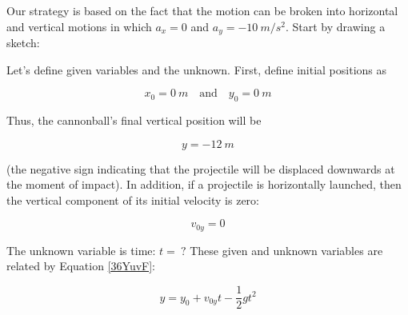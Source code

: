 \documentclass[main-physics.tex]{subfiles}
\begin{document}
\Solution Our strategy is based on the fact that the motion can be broken into horizontal and vertical motions in which $a_x = 0$ and $a_y = \SI{-10}{m/s^2}$. Start by drawing a sketch:

\begin{center}
\end{center}


Let's define given variables and the unknown. First, define initial positions as 

\begin{equation*}
    x_0 = \SI{0}{m} \quad \text{and} \quad y_0 = \SI{0}{m}
\end{equation*}

Thus, the cannonball's final vertical position will be

\begin{equation*}
    y = -\SI{12}{m}
\end{equation*}

(the negative sign indicating that the projectile will be displaced downwards at the moment of impact). In addition, if a projectile is horizontally launched, then the vertical component of its initial velocity is zero:

\begin{equation*}
    v_{0y} = 0
\end{equation*}

The unknown variable is time: $t =\ ?$ These given and unknown variables are related by Equation \eqref{36YuvF}:

\begin{equation*}
    y = y_0 + v_{0y}t - \frac{1}{2}  g t^2 
\end{equation*}
\end{document}
